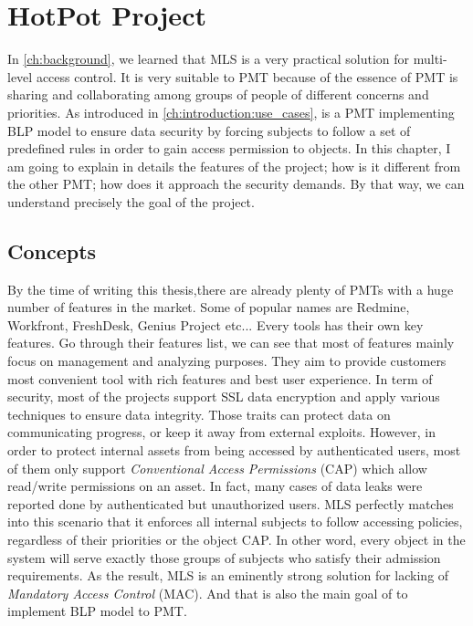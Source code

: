 
\chapter{HotPot Project} %

\label{ch:hopot_project} %


In \autoref{ch:background}, we learned that MLS is a very practical solution for multi-level access control.
It is very suitable to PMT because of the essence of PMT is sharing and collaborating among groups of people of different concerns and priorities.
As introduced in \autoref{ch:introduction:use_cases}, \myProject is a PMT implementing BLP model to ensure data security by forcing subjects to follow a set of predefined rules in order to gain access permission to objects.
In this chapter, I am going to explain in details the features of the project; how is it different from the other PMT; how does it approach the security demands.
By that way, we can understand precisely the goal of the project.


\section{Concepts}
\label{ch:hopot_project:concepts}

By the time of writing this thesis,there are already plenty of PMTs with a huge number of features in the market.
Some of popular names are Redmine, Workfront, FreshDesk, Genius Project etc...
Every tools has their own key features.
Go through their features list, we can see that most of features mainly focus on management and analyzing purposes.
They aim to provide customers most convenient tool with rich features and best user experience.
In term of security, most of the projects support SSL data encryption and apply various techniques to ensure data integrity.
Those traits can protect data on communicating progress, or keep it away from external exploits.
However, in order to protect internal assets from being accessed by authenticated users, most of them only support \emph{Conventional Access Permissions} (CAP) which allow read/write permissions on an asset.
In fact, many cases of data leaks were reported done by authenticated but unauthorized users.
MLS perfectly matches into this scenario that it enforces all internal subjects to follow accessing policies, regardless of their priorities or the object CAP.
In other word, every object in the system will serve exactly those groups of subjects who satisfy their admission requirements.
As the result, MLS is an eminently strong solution for lacking of \emph{Mandatory Access Control} (MAC).
And that is also the main goal of \myProject to implement BLP model to PMT.

